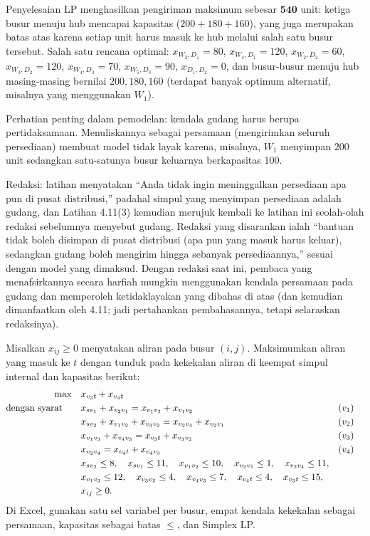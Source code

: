 Penyelesaian LP menghasilkan pengiriman maksimum sebesar $\mathbf{540}$ unit: ketiga busur menuju hub mencapai kapasitas ($200 + 180 + 160$), yang juga merupakan batas atas karena setiap unit harus masuk ke hub melalui salah satu busur tersebut. Salah satu rencana optimal: $x_{W_2,D_1} = 80$, $x_{W_4,D_1} = 120$, $x_{W_2,D_2} = 60$, $x_{W_3,D_2} = 120$, $x_{W_4,D_3} = 70$, $x_{W_5,D_3} = 90$, $x_{D_1,D_2} = 0$, dan busur-busur menuju hub masing-masing bernilai $200, 180, 160$ (terdapat banyak optimum alternatif, misalnya yang menggunakan $W_1$).

Perhatian penting dalam pemodelan: kendala gudang harus berupa pertidaksamaan. Menuliskannya sebagai persamaan (mengirimkan seluruh persediaan) membuat model tidak layak karena, misalnya, $W_1$ menyimpan $200$ unit sedangkan satu-satunya busur keluarnya berkapasitas $100$.

\begin{qaflag}
Redaksi: latihan menyatakan ``Anda tidak ingin meninggalkan persediaan apa pun di pusat distribusi,'' padahal simpul yang menyimpan persediaan adalah gudang, dan Latihan 4.11(3) kemudian merujuk kembali ke latihan ini seolah-olah redaksi sebelumnya menyebut gudang. Redaksi yang disarankan ialah ``bantuan tidak boleh disimpan di pusat distribusi (apa pun yang masuk harus keluar), sedangkan gudang boleh mengirim hingga sebanyak persediaannya,'' sesuai dengan model yang dimaksud. Dengan redaksi saat ini, pembaca yang menafsirkannya secara harfiah mungkin menggunakan kendala persamaan pada gudang dan memperoleh ketidaklayakan yang dibahas di atas (dan kemudian dimanfaatkan oleh 4.11; jadi pertahankan pembahasannya, tetapi selaraskan redaksinya).
\end{qaflag}


Misalkan $x_{ij} \geq 0$ menyatakan aliran pada busur $(i,j)$. Maksimumkan aliran yang masuk ke $t$ dengan tunduk pada kekekalan aliran di keempat simpul internal dan kapasitas berikut:
\begin{align*}
\max \quad & x_{v_3 t} + x_{v_4 t}\\
\mbox{dengan syarat}\quad \quad & x_{s v_1} + x_{v_2 v_1} = x_{v_1 v_3} + x_{v_1 v_2} && (v_1)\\
& x_{s v_2} + x_{v_1 v_2} + x_{v_3 v_2} = x_{v_2 v_4} + x_{v_2 v_1} && (v_2)\\
& x_{v_1 v_3} + x_{v_4 v_3} = x_{v_3 t} + x_{v_3 v_2} && (v_3)\\
& x_{v_2 v_4} = x_{v_4 t} + x_{v_4 v_3} && (v_4)\\
& x_{s v_2} \leq 8, \quad x_{s v_1} \leq 11, \quad x_{v_1 v_2} \leq 10, \quad x_{v_2 v_1} \leq 1, \quad x_{v_2 v_4} \leq 11,\\
& x_{v_1 v_3} \leq 12, \quad x_{v_3 v_2} \leq 4, \quad x_{v_4 v_3} \leq 7, \quad x_{v_4 t} \leq 4, \quad x_{v_3 t} \leq 15,\\
& x_{ij} \geq 0.
\end{align*}
Di Excel, gunakan satu sel variabel per busur, empat kendala kekekalan sebagai persamaan, kapasitas sebagai batas $\leq$, dan Simplex LP.

